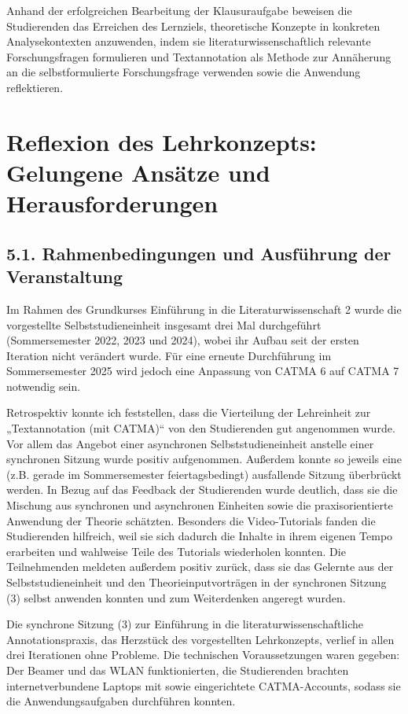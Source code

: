 \documentclass[
          a4paper,
        ]{article}
\begin{document}
Anhand der erfolgreichen Bearbeitung der Klausuraufgabe beweisen die
Studierenden das Erreichen des Lernziels, theoretische Konzepte in
konkreten Analysekontexten anzuwenden, indem sie
literaturwissenschaftlich relevante Forschungsfragen formulieren und
Textannotation als Methode zur Annäherung an die selbstformulierte
Forschungsfrage verwenden sowie die Anwendung reflektieren.

\section{Reflexion des Lehrkonzepts: Gelungene Ansätze und
Herausforderungen}\label{reflexion-des-lehrkonzepts-gelungene-ansuxe4tze-und-herausforderungen}

\subsection{5.1. Rahmenbedingungen und Ausführung der
Veranstaltung}\label{rahmenbedingungen-und-ausfuxfchrung-der-veranstaltung}

Im Rahmen des Grundkurses Einführung in die Literaturwissenschaft 2
wurde die vorgestellte Selbststudieneinheit insgesamt drei Mal
durchgeführt (Sommersemester 2022, 2023 und 2024), wobei ihr Aufbau seit
der ersten Iteration nicht verändert wurde. Für eine erneute
Durchführung im Sommersemester 2025 wird jedoch eine Anpassung von CATMA
6 auf CATMA 7 notwendig sein.

Retrospektiv konnte ich feststellen, dass die Vierteilung der
Lehreinheit zur „Textannotation (mit CATMA)`` von den Studierenden gut
angenommen wurde. Vor allem das Angebot einer asynchronen
Selbststudieneinheit anstelle einer synchronen Sitzung wurde positiv
aufgenommen. Außerdem konnte so jeweils eine (z.B. gerade im
Sommersemester feiertagsbedingt) ausfallende Sitzung überbrückt werden.
In Bezug auf das Feedback der Studierenden wurde deutlich, dass sie die
Mischung aus synchronen und asynchronen Einheiten sowie die
praxisorientierte Anwendung der Theorie schätzten. Besonders die
Video-Tutorials fanden die Studierenden hilfreich, weil sie sich dadurch
die Inhalte in ihrem eigenen Tempo erarbeiten und wahlweise Teile des
Tutorials wiederholen konnten. Die Teilnehmenden meldeten außerdem
positiv zurück, dass sie das Gelernte aus der Selbststudieneinheit und
den Theorieinputvorträgen in der synchronen Sitzung (3) selbst anwenden
konnten und zum Weiterdenken angeregt wurden.

Die synchrone Sitzung (3) zur Einführung in die
literaturwissenschaftliche Annotationspraxis, das Herzstück des
vorgestellten Lehrkonzepts, verlief in allen drei Iterationen ohne
Probleme. Die technischen Voraussetzungen waren gegeben: Der Beamer und
das WLAN funktionierten, die Studierenden brachten internetverbundene
Laptops mit sowie eingerichtete CATMA-Accounts, sodass sie die
Anwendungsaufgaben durchführen konnten.
\end{document}

